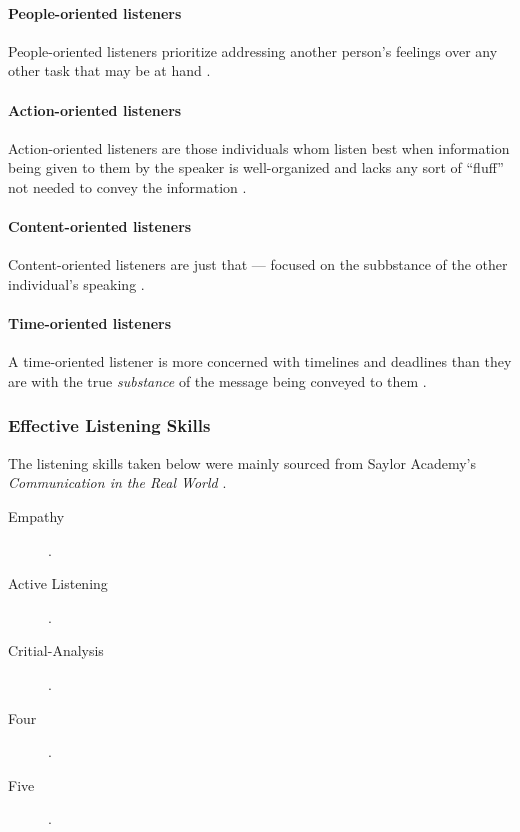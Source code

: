 \documentclass[stu,12pt]{apa7}
\begin{document}
        \paragraph{People-oriented listeners}
          People-oriented listeners prioritize addressing another person's
            feelings over any other task that may be at hand
            \parencite[pp. 338]{noauthor_communication_2013}.

        \paragraph{Action-oriented listeners}
          Action-oriented listeners are those individuals whom listen best when
            information being given to them by the speaker is well-organized
            and lacks any sort of ``fluff'' not needed to convey the information
            \parencite[pp. 338--339]{noauthor_communication_2013}.

        \paragraph{Content-oriented listeners}
          Content-oriented listeners are just that --- focused on the subbstance
            of the other individual's speaking
            \parencite[pp. 339]{noauthor_communication_2013}.

        \paragraph{Time-oriented listeners}
          A time-oriented listener is more concerned with timelines and
            deadlines than they are with the true \textit{substance} of the
            message being conveyed to them
            \parencite[pp. 339--340]{noauthor_communication_2013}.


      \subsubsection{Effective Listening Skills}
        The listening skills taken below were mainly sourced from Saylor
          Academy's \textit{Communication in the Real World}
          \parencite[pp. 330--345]{noauthor_communication_2013}.

          \begin{description}
            \item[Empathy]
              \parencite[pp. ]{noauthor_communication_2013}.
            \item[Active Listening]
              \parencite[pp. ]{noauthor_communication_2013}.
            \item[Critial-Analysis]
              \parencite[pp. ]{noauthor_communication_2013}.
            \item[Four]
              \parencite[pp. ]{noauthor_communication_2013}.
            \item[Five]
              \parencite[pp. ]{noauthor_communication_2013}.
          \end{description}
\end{document}
